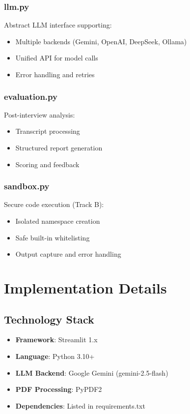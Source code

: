 \documentclass[12pt,a4paper]{article}
\begin{document}
\subsubsection{llm.py}
Abstract LLM interface supporting:
\begin{itemize}
    \item Multiple backends (Gemini, OpenAI, DeepSeek, Ollama)
    \item Unified API for model calls
    \item Error handling and retries
\end{itemize}

\subsubsection{evaluation.py}
Post-interview analysis:
\begin{itemize}
    \item Transcript processing
    \item Structured report generation
    \item Scoring and feedback
\end{itemize}

\subsubsection{sandbox.py}
Secure code execution (Track B):
\begin{itemize}
    \item Isolated namespace creation
    \item Safe built-in whitelisting
    \item Output capture and error handling
\end{itemize}

\section{Implementation Details}

\subsection{Technology Stack}

\begin{itemize}
    \item \textbf{Framework}: Streamlit 1.x
    \item \textbf{Language}: Python 3.10+
    \item \textbf{LLM Backend}: Google Gemini (gemini-2.5-flash)
    \item \textbf{PDF Processing}: PyPDF2
    \item \textbf{Dependencies}: Listed in requirements.txt
\end{itemize}
\end{document}
